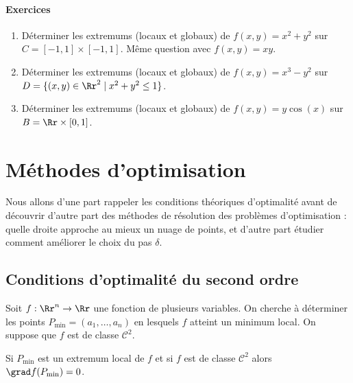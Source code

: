 \paragraph{Exercices}
    \begin{enumerate}
        \item Déterminer les extremums (locaux et globaux) de $f(x,y) = x^2+y^2$ sur $C = [-1,1] \times [-1,1]$. Même question avec $f(x,y)= xy$.

        \item Déterminer les extremums (locaux et globaux) de $f(x,y) = x^3-y^2$ sur $D = \lbrace (x,y) \in \Rr^2  \mid  x^2 + y^2 \leq 1 \rbrace$.

        \item Déterminer les extremums (locaux et globaux) de $f(x,y) = y\cos(x)$ sur $B = \Rr \times [0,1]$.
    \end{enumerate}







\section{Méthodes d'optimisation}

Nous allons d'une part rappeler les conditions théoriques d'optimalité avant de découvrir d'autre part des méthodes de résolution  des problèmes d'optimisation : quelle droite approche au mieux un nuage de points, et d'autre part étudier comment améliorer le choix du pas $\delta$.

\subsection{Conditions d'optimalité du second ordre}


Soit $f : \Rr^n \to \Rr$ une fonction de plusieurs variables. On cherche à déterminer les points $P_{\min} = (a_1,\ldots,a_n)$ en lesquels $f$ atteint un minimum local. On suppose que $f$ est de classe $\mathcal{C}^2$. 

\begin{theoreme}{}{}
	Si $P_{\min}$ est un extremum local de $f$ et si $f$ est de classe $\mathcal{C}^2$ alors $\grad f(P_{\min}) = 0$.
\end{theoreme}

